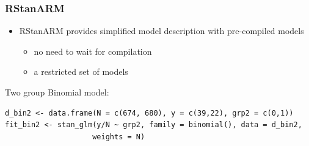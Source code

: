 \documentclass[10pt]{beamer}
\begin{document}
\begin{frame}[fragile]

\frametitle{RStanARM}

  \begin{itemize}
  \item RStanARM provides simplified model description with
    pre-compiled models
    \begin{itemize}
    \item no need to wait for compilation
    \item a restricted set of models
    \end{itemize}
  \end{itemize}

Two group Binomial model:
  {\scriptsize
\begin{lstlisting}
d_bin2 <- data.frame(N = c(674, 680), y = c(39,22), grp2 = c(0,1))
fit_bin2 <- stan_glm(y/N ~ grp2, family = binomial(), data = d_bin2,
                    weights = N)
\end{lstlisting}
  }


\end{frame}
\end{document}
